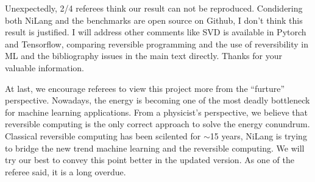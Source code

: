 \documentclass{article}
\begin{document}
Unexpectedly, 2/4 referees think our result can not be reproduced. Condidering both NiLang and the benchmarks are open source on Github, I don't think this result is justified.
I will address other comments like SVD is available in Pytorch and Tensorflow,
comparing reversible programming and the use of reversibility in ML and the bibliography issues in the main text directly. Thanks for your valuable information.

At last, we encourage referees to view this project more from the ``furture'' perspective.
Nowadays, the energy is becoming one of the most deadly bottleneck for machine learning applications.
From a physicist's perspective, we believe that reversible computing is the only correct approach to solve the energy conundrum.
Classical reversible computing has been scilented for $\sim$15 years, NiLang is trying to bridge the new trend machine learning and the reversible computing.
We will try our best to convey this point better in the updated version. As one of the referee said, it is a long overdue.
\end{document}
